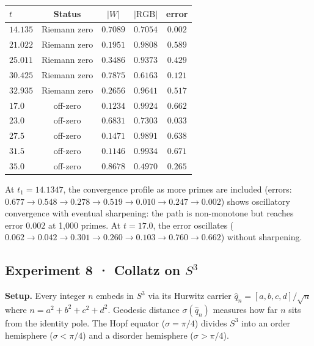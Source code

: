 \documentclass[12pt,a4paper]{article}
\theoremstyle{definition}
\theoremstyle{remark}
\begin{document}
\begin{center}
\begin{tabular}{lcccc}
\toprule
$t$ & Status & $|W|$ & $|\mathrm{RGB}|$ & error \\
\midrule
$14.135$ & Riemann zero & $0.7089$ & $0.7054$ & $0.002$ \\
$21.022$ & Riemann zero & $0.1951$ & $0.9808$ & $0.589$ \\
$25.011$ & Riemann zero & $0.3486$ & $0.9373$ & $0.429$ \\
$30.425$ & Riemann zero & $0.7875$ & $0.6163$ & $0.121$ \\
$32.935$ & Riemann zero & $0.2656$ & $0.9641$ & $0.517$ \\
\midrule
$17.0$   & off-zero & $0.1234$ & $0.9924$ & $0.662$ \\
$23.0$   & off-zero & $0.6831$ & $0.7303$ & $0.033$ \\
$27.5$   & off-zero & $0.1471$ & $0.9891$ & $0.638$ \\
$31.5$   & off-zero & $0.1146$ & $0.9934$ & $0.671$ \\
$35.0$   & off-zero & $0.8678$ & $0.4970$ & $0.265$ \\
\bottomrule
\end{tabular}
\end{center}

At $t_1 = 14.1347$, the convergence profile as more primes are included
(errors: $0.677 \to 0.548 \to 0.278 \to 0.519 \to 0.010 \to 0.247 \to 0.002$)
shows oscillatory convergence with eventual sharpening: the path is
non-monotone but reaches error $0.002$ at 1{,}000 primes. At $t = 17.0$,
the error oscillates ($0.062 \to 0.042 \to 0.301 \to 0.260 \to 0.103 \to 0.760 \to 0.662$)
without sharpening.

\subsection{Experiment 8 · Collatz on $S^3$}
\label{app:exp8}

\textbf{Setup.} Every integer $n$ embeds in $S^3$ via its Hurwitz carrier
$\hat{q}_n = [a,b,c,d]/\!\sqrt{n}$ where $n = a^2+b^2+c^2+d^2$.
Geodesic distance $\sigma(\hat{q}_n)$ measures how far $n$ sits from the
identity pole. The Hopf equator ($\sigma = \pi/4$) divides $S^3$ into an
order hemisphere ($\sigma < \pi/4$) and a disorder hemisphere ($\sigma > \pi/4$).
\end{document}
